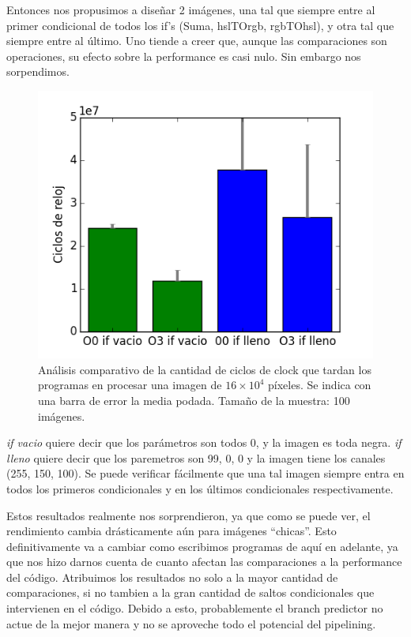 Entonces nos propusimos a diseñar 2 imágenes, una tal que siempre entre al primer condicional de todos los if's (Suma, hslTOrgb, rgbTOhsl), y otra tal que siempre entre al último. Uno tiende a creer que, aunque las comparaciones son operaciones, su efecto sobre la performance es casi nulo. Sin embargo nos sorpendimos.


\begin{figure}[H] 
	\centering
  \includegraphics[scale=0.7]{images/hsl-ifs.png}
  \caption{Análisis comparativo de la cantidad de ciclos de clock que tardan los programas en procesar una imagen de $16\times 10^4$ píxeles. Se indica con una barra de error la media podada. Tamaño de la muestra: 100 imágenes.}
\end{figure}


\textit{if vacio} quiere decir que los parámetros son todos 0, y la imagen es toda negra. \textit{if lleno} quiere decir que los paremetros son 99, 0, 0 y la imagen tiene los canales (255, 150, 100).  Se puede verificar fácilmente que una tal imagen siempre entra en todos los primeros condicionales y en los últimos condicionales respectivamente.

Estos resultados realmente nos sorprendieron, ya que como se puede ver, el rendimiento cambia drásticamente aún para imágenes ``chicas''. Esto definitivamente va a cambiar como escribimos programas de aquí en adelante, ya que nos hizo darnos cuenta de cuanto afectan las comparaciones a la performance del código.
Atribuimos los resultados no solo a la mayor cantidad de comparaciones, si no tambien a la gran cantidad de saltos condicionales que intervienen en el código. Debido a esto, probablemente el branch predictor no actue de la mejor manera y no se aproveche todo el potencial del pipelining.


